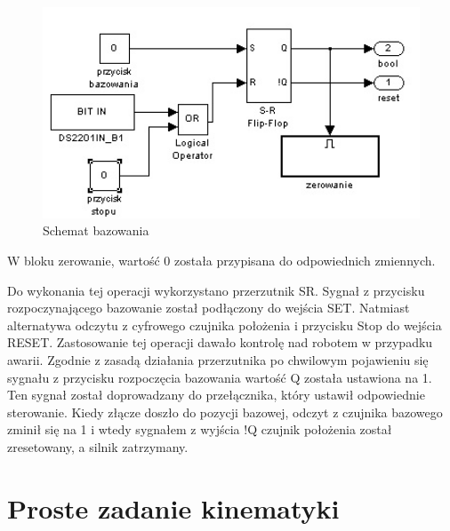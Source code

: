 \begin{figure}
\centering
\includegraphics[width=12cm] {dodatki/bazowanie_p1_wyciete.jpg}
\caption{Schemat bazowania}
\label{fig:schemat_bazowania}
\end{figure}
W bloku zerowanie, wartość 0 została przypisana do odpowiednich zmiennych. 

Do wykonania tej operacji wykorzystano przerzutnik SR. Sygnał z przycisku rozpoczynającego bazowanie został podłączony do wejścia SET. Natmiast alternatywa odczytu z cyfrowego czujnika położenia i przycisku Stop do wejścia RESET. Zastosowanie tej operacji dawało kontrolę nad robotem w przypadku awarii. Zgodnie z zasadą działania przerzutnika po chwilowym pojawieniu się sygnału z przycisku rozpoczęcia bazowania wartość Q została ustawiona na 1. Ten sygnał został doprowadzany do przełącznika, który ustawił odpowiednie sterowanie. Kiedy złącze doszło do pozycji bazowej, odczyt z czujnika bazowego zminił się na 1 i wtedy sygnałem z wyjścia !Q czujnik położenia został zresetowany, a silnik zatrzymany.

\section{Proste zadanie kinematyki}

